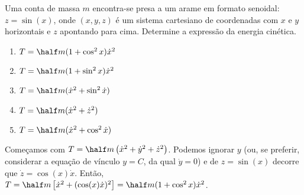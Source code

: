 \begin{question}
    Uma conta de massa $m$ encontra-se presa a um arame em formato senoidal: $z = \sin(x)$, onde $(x,y,z)$ é um sistema cartesiano de coordenadas com $x$ e $y$ horizontais e $z$ apontando para cima.
    Determine a expressão da energia cinética.
    \begin{enumerate}
      \item $T = \half m (1 + \cos^2 x) \dot x^2$ \rightanswer
      \item $T = \half m (1 + \sin^2 x) \dot x^2$
      \item $T = \half m (\dot x^2 + \sin^2 \dot x)$
      \item $T = \half m (\dot x^2 + \dot z^2)$
      \item $T = \half m (\dot x^2 + \cos^2 \dot x)$
    \end{enumerate}

    \begin{solution}
      Começamos com $T = \half m \left(\dot x^2 + \dot y^2 + \dot z^2\right)$.
      Podemos ignorar $y$ (ou, se preferir, considerar a equação de vínculo $y = C$, da qual $\dot y = 0$) e de $z = \sin(x)$ decorre que $\dot z = \cos(x)\dot x$.
      Então, $T = \half m \left[\dot x^2 + (\cos(x)\dot x)^2\right] = \half m (1 + \cos^2 x) \dot x^2$.
    \end{solution}
\end{question}
